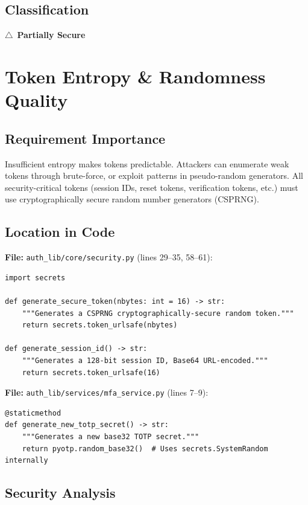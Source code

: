 \documentclass[11pt,a4paper]{article}
\newcommand{\partiallysecure}{\textcolor{warningorange}{$\triangle$~\textbf{Partially Secure}}}
\begin{document}
\subsection{Classification}
\partiallysecure

\newpage
\section{Token Entropy \& Randomness Quality}

\subsection{Requirement Importance}
Insufficient entropy makes tokens predictable. Attackers can enumerate weak tokens through brute-force, or exploit patterns in pseudo-random generators. All security-critical tokens (session IDs, reset tokens, verification tokens, etc.) must use cryptographically secure random number generators (CSPRNG).

\subsection{Location in Code}

\textbf{File:} \texttt{auth\_lib/core/security.py} (lines 29--35, 58--61):
\begin{lstlisting}
import secrets

def generate_secure_token(nbytes: int = 16) -> str:
    """Generates a CSPRNG cryptographically-secure random token."""
    return secrets.token_urlsafe(nbytes)

def generate_session_id() -> str:
    """Generates a 128-bit session ID, Base64 URL-encoded."""
    return secrets.token_urlsafe(16)
\end{lstlisting}

\textbf{File:} \texttt{auth\_lib/services/mfa\_service.py} (lines 7--9):
\begin{lstlisting}
@staticmethod
def generate_new_totp_secret() -> str:
    """Generates a new base32 TOTP secret."""
    return pyotp.random_base32()  # Uses secrets.SystemRandom internally
\end{lstlisting}

\subsection{Security Analysis}
\end{document}
